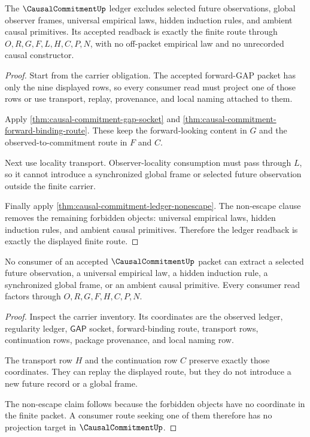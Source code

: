 \begin{theorem}
\label{thm:causal-commitment-ledger-exactness}
The $\CausalCommitmentUp$ ledger excludes selected future observations, global observer frames, universal empirical laws, hidden induction rules, and ambient causal primitives. Its accepted readback is exactly the finite route through $O,R,G,F,L,H,C,P,N$, with no off-packet empirical law and no unrecorded causal constructor.
\end{theorem}
\begin{proof}
Start from the carrier obligation. The accepted forward-GAP packet has only the nine displayed rows, so every consumer read must project one of those rows or use transport, replay, provenance, and local naming attached to them.

Apply \autoref{thm:causal-commitment-gap-socket} and \autoref{thm:causal-commitment-forward-binding-route}. These keep the forward-looking content in $G$ and the observed-to-commitment route in $F$ and $C$.

Next use locality transport. Observer-locality consumption must pass through $L$, so it cannot introduce a synchronized global frame or selected future observation outside the finite carrier.

Finally apply \autoref{thm:causal-commitment-ledger-nonescape}. The non-escape clause removes the remaining forbidden objects: universal empirical laws, hidden induction rules, and ambient causal primitives. Therefore the ledger readback is exactly the displayed finite route.
\end{proof}

\begin{theorem}
\label{thm:causal-commitment-non-escape-boundary}
No consumer of an accepted $\CausalCommitmentUp$ packet can extract a selected future observation, a universal empirical law, a hidden induction rule, a synchronized global frame, or an ambient causal primitive. Every consumer read factors through $O,R,G,F,H,C,P,N$.
\end{theorem}
\begin{proof}
Inspect the carrier inventory. Its coordinates are the observed ledger, regularity ledger, $\mathsf{GAP}$ socket, forward-binding route, transport rows, continuation rows, package provenance, and local naming row.

The transport row $H$ and the continuation row $C$ preserve exactly those coordinates. They can replay the displayed route, but they do not introduce a new future record or a global frame.

The non-escape claim follows because the forbidden objects have no coordinate in the finite packet. A consumer route seeking one of them therefore has no projection target in $\CausalCommitmentUp$.
\end{proof}

